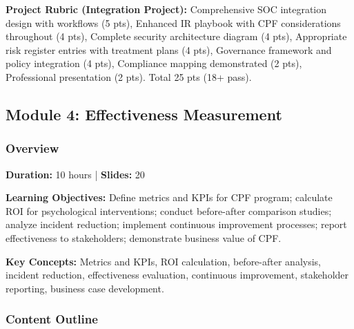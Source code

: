 \documentclass[11pt,a4paper]{article}
\begin{document}
\textbf{Project Rubric (Integration Project):} Comprehensive SOC integration design with workflows (5 pts), Enhanced IR playbook with CPF considerations throughout (4 pts), Complete security architecture diagram (4 pts), Appropriate risk register entries with treatment plans (4 pts), Governance framework and policy integration (4 pts), Compliance mapping demonstrated (2 pts), Professional presentation (2 pts). Total 25 pts (18+ pass).

\subsection{Module 4: Effectiveness Measurement}

\subsubsection{Overview}

\textbf{Duration:} 10 hours | \textbf{Slides:} 20

\textbf{Learning Objectives:} Define metrics and KPIs for CPF program; calculate ROI for psychological interventions; conduct before-after comparison studies; analyze incident reduction; implement continuous improvement processes; report effectiveness to stakeholders; demonstrate business value of CPF.

\textbf{Key Concepts:} Metrics and KPIs, ROI calculation, before-after analysis, incident reduction, effectiveness evaluation, continuous improvement, stakeholder reporting, business case development.

\subsubsection{Content Outline}
\end{document}
